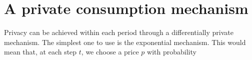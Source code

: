 \documentclass[a4paper,onecolumn]{article}
\numberwithin{algorithm}{section}
\theoremstyle{plain}
\theoremstyle{definition}
\theoremstyle{example}
\newcommand{\demand}{x}
\newcommand{\fdemand}{\beta}
\newcommand{\cost}{c}
\begin{document}
\section{A private consumption mechanism}

Privacy can be achieved within each period through a differentially
private mechanism. The simplest one to use is the exponential
mechanism. This would mean that, at each step $t$, we choose a price $p$ with probability




\end{document}
